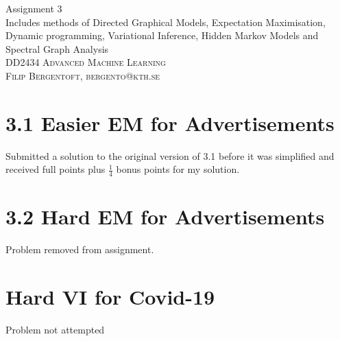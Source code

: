 \documentclass[11pt,oneside,a4paper]{article}
\date{}
\theoremstyle{definition}
\theoremstyle{remark}
\begin{document}
\renewcommand{\bibname}{References}
\hypersetup{citecolor=black}
\begin{titlepage}\centering
\vspace*{\fill}
\Huge Assignment 3\\
\vspace*{10mm}
\large Includes methods of Directed Graphical Models, Expectation Maximisation, Dynamic programming, Variational Inference, Hidden Markov Models and Spectral Graph Analysis\\
\vspace*{\fill}
\large \textsc{DD2434 Advanced Machine Learning} \\
\textsc{Filip Bergentoft, bergento@kth.se} \\
\end{titlepage}

\newpage
\section*{3.1 Easier EM for Advertisements}
Submitted a solution to the original version of 3.1 before it was simplified and received full points plus $\frac{1}{4}$ bonus points for my solution.

\section*{3.2 Hard EM for Advertisements}
Problem removed from assignment.
\newpage


\section*{Hard VI for Covid-19}
Problem not attempted


\end{document}
